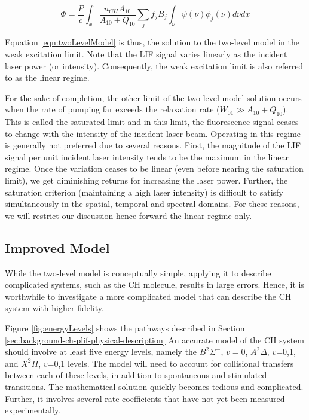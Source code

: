 \begin{equation}
  \Phi = \frac{P}{c} \int_x \frac{n_{CH} A_{10}}{A_{10}+Q_{10}} \sum_j f_j B_j \int_\nu \psi(\nu) \phi_j(\nu) d\nu dx
  \label{eqn:twoLevelModel}
\end{equation}

Equation \ref{eqn:twoLevelModel} is thus, the solution to the two-level model in the weak excitation limit.
Note that the LIF signal varies linearly as the incident laser power (or intensity).
Consequently, the weak excitation limit is also referred to as the linear regime.

For the sake of completion, the other limit of the two-level model solution occurs when the rate of pumping far exceeds the relaxation rate (\(W_{01} \gg A_{10} + Q_{10}\)).
This is called the saturated limit and in this limit, the fluorescence signal ceases to change with the intensity of the incident laser beam.
Operating in this regime is generally not preferred due to several reasons.
First, the magnitude of the LIF signal per unit incident laser intensity tends to be the maximum in the linear regime.
Once the variation ceases to be linear (even before nearing the saturation limit), we get diminishing returns for increasing the laser power.
Further, the saturation criterion (maintaining a high laser intensity) is difficult to satisfy simultaneously in the spatial, temporal and spectral domains.
For these reasons, we will restrict our discussion hence forward the linear regime only.

\subsection{Improved Model}
\label{subsec:chplif-improved-model}

While the two-level model is conceptually simple, applying it to describe complicated systems, such as the CH molecule, results in large errors.\cite{1997-daily}
Hence, it is worthwhile to investigate a more complicated model that can describe the CH system with higher fidelity.



Figure \ref{fig:energyLevels} shows the pathways described in Section \ref{sec:background-ch-plif-physical-description}
An accurate model of the CH system should involve at least five energy levels, namely the \(B^2\Sigma^-\), \(v=0\), \(A^2\Delta\), \(v\)=0,1, and \(X^2\Pi\), \(v\)=0,1 levels.
The model will need to account for collisional transfers between each of these levels, in addition to spontaneous and stimulated transitions.
The mathematical solution quickly becomes tedious and complicated.
Further, it involves several rate coefficients that have not yet been measured experimentally.

